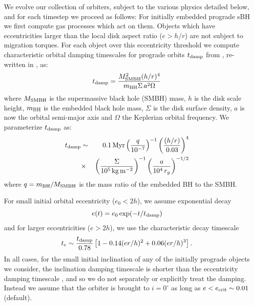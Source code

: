 We evolve our collection of orbiters, subject to the various physics detailed below, and for each timestep we proceed as follows: For initially embedded prograde sBH we first compute gas processes which act on them. 
Objects which have eccentricities larger than the local disk aspect ratio ($e>h/r$) are not subject to migration torques.
For each object over this eccentricity threshold we compute characteristic orbital damping timescales for prograde orbits $t_{\rm damp}$ from \citet{TanakaWard04}, re-written in \citet{McKernanFord24}, as: 
\begin{equation}
    t_{\rm damp}=\frac{M_{\rm SMBH}^{2}(h/r)^{4}}{m_{\rm BH}\Sigma \,a^{2} \Omega}
\end{equation}
where $M_{\rm SMBH}$ is the supermassive black hole (SMBH) mass, $h$ is the disk scale height, $m_{\rm BH}$ is the embedded black hole mass, $\Sigma$ is the disk surface density, $a$ is now the orbital semi-major axis and $\Omega$ the Keplerian orbital frequency.
We parameterize $t_{\rm damp}$ as:
\begin{eqnarray}
    t_{\rm damp} &\sim& 0.1\,{\rm Myr} \left(\frac{q}{10^{-7}}\right)^{-1}\left(\frac{(h/r)}{0.03}\right)^{4} \nonumber \\
    &\times& \left(\frac{\Sigma}{10^{5}\,{\rm kg \,m^{-2}}}\right)^{-1}\left(\frac{a}{10^{4}\,r_{g}}\right)^{-1/2}
\label{eq:damp}
\end{eqnarray}
where $q=m_{\rm BH}/M_{\rm SMBH}$ is the mass ratio of the embedded BH to the SMBH. 

For small initial orbital eccentricity ($e_{0}<2h$), we assume exponential decay \citep{PapaloizouLarwood00} 
\begin{equation}
    e(t)=e_{0}\,{\rm exp}(-t/t_{\rm damp})
\end{equation}
and for larger eccentricities ($e>2h$), we use the characteristic decay timescale \citep{BitschKley10,Horn+12} 
\begin{equation}
    t_{e} \sim \frac{t_{\rm damp}}{0.78} \left[ 1 -0.14 (er/h)^{2} + 0.06 (er/h)^{3} \right].
\label{eq:te}
\end{equation}
In all cases, for the small initial inclination of any of the initially prograde objects we consider, the inclination damping timescale is shorter than the eccentricity damping timescale \citep[see e.g.][]{WangZhuLin24}, and so we do not separately or explicitly treat the damping.
Instead we assume that the orbiter is brought to $i=0^{\circ}$ as long as $e<e_{\rm crit} \sim 0.01$(default).

